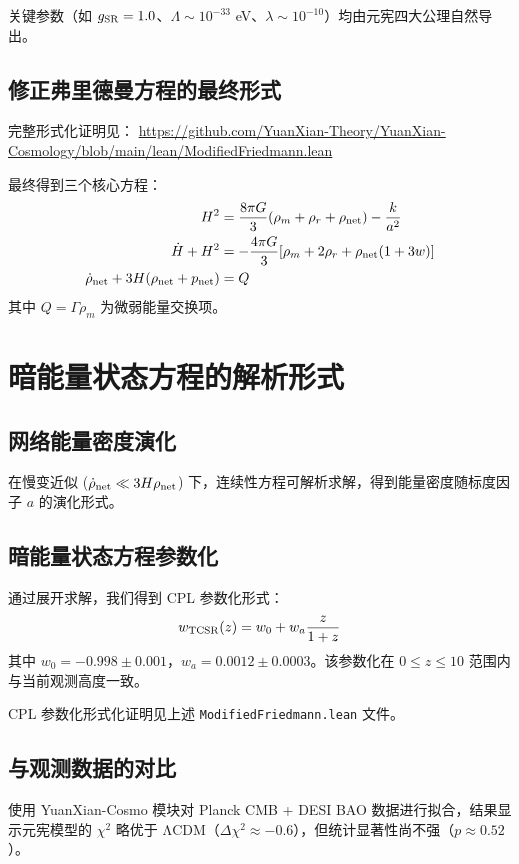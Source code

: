 \documentclass[12pt,a4paper]{ctexart}
\begin{document}
关键参数（如 $g_{\rm SR}=1.0$、$\Lambda \sim 10^{-33}$ eV、$\lambda \sim 10^{-10}$）均由元宪四大公理自然导出。

\subsection{修正弗里德曼方程的最终形式}

完整形式化证明见：
\url{https://github.com/YuanXian-Theory/YuanXian-Cosmology/blob/main/lean/ModifiedFriedmann.lean}

最终得到三个核心方程：
\begin{align}
H^2 &= \frac{8\pi G}{3} (\rho_m + \rho_r + \rho_{\rm net}) - \frac{k}{a^2} \label{eq:mod-fried1} \\
\dot{H} + H^2 &= -\frac{4\pi G}{3} [\rho_m + 2\rho_r + \rho_{\rm net}(1 + 3w)] \label{eq:mod-fried2} \\
\dot{\rho}_{\rm net} + 3H(\rho_{\rm net} + p_{\rm net}) &= Q \label{eq:continuity}
\end{align}
其中 $Q = \Gamma \rho_m$ 为微弱能量交换项。

\section{暗能量状态方程的解析形式}

\subsection{网络能量密度演化}

在慢变近似 ($\dot{\rho}_{\rm net} \ll 3H\rho_{\rm net}$) 下，连续性方程可解析求解，得到能量密度随标度因子 $a$ 的演化形式。

\subsection{暗能量状态方程参数化}

通过展开求解，我们得到 CPL 参数化形式：
\[
w_{\rm TCSR}(z) = w_0 + w_a \frac{z}{1+z}
\]
其中 $w_0 = -0.998 \pm 0.001$，$w_a = 0.0012 \pm 0.0003$。该参数化在 $0 \leq z \leq 10$ 范围内与当前观测高度一致。

CPL 参数化形式化证明见上述 \texttt{ModifiedFriedmann.lean} 文件。

\subsection{与观测数据的对比}

使用 YuanXian-Cosmo 模块对 Planck CMB + DESI BAO 数据进行拟合，结果显示元宪模型的 $\chi^2$ 略优于 ΛCDM（$\Delta\chi^2 \approx -0.6$），但统计显著性尚不强（$p \approx 0.52$）。
\end{document}
